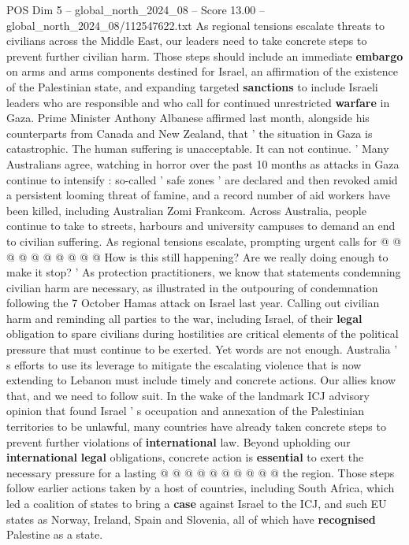 \begin{textsample}{POS Dim 5 – global\_north\_2024\_08 – Score 13.00 – global\_north\_2024\_08/112547622.txt}  \label{ex:f5_pos_374}
As regional tensions escalate threats to civilians across the Middle East, our leaders need to take concrete steps to prevent further civilian harm.
Those steps should include an immediate \textbf{embargo} on arms and arms components destined for Israel, an affirmation of the existence of the Palestinian state, and expanding targeted \textbf{sanctions} to include Israeli leaders who are responsible and who call for continued unrestricted \textbf{warfare} in Gaza.
Prime Minister Anthony Albanese affirmed last month, alongside his counterparts from Canada and New Zealand, that ' the situation in Gaza is catastrophic.
The human suffering is unacceptable.
It can not continue. ' Many Australians agree, watching in horror over the past 10 months as attacks in Gaza continue to intensify : so-called ' safe zones ' are declared and then revoked amid a persistent looming threat of famine, and a record number of aid workers have been killed, including Australian Zomi Frankcom.
Across Australia, people continue to take to streets, harbours and university campuses to demand an end to civilian suffering.
As regional tensions escalate, prompting urgent calls for @ @ @ @ @ @ @ @ @ @ How is this still happening?
Are we really doing enough to make it stop? ' As protection practitioners, we know that statements condemning civilian harm are necessary, as illustrated in the outpouring of condemnation following the 7 October Hamas attack on Israel last year.
Calling out civilian harm and reminding all parties to the war, including Israel, of their \textbf{legal} obligation to spare civilians during hostilities are critical elements of the political pressure that must continue to be exerted.
Yet words are not enough.
Australia ' s efforts to use its leverage to mitigate the escalating violence that is now extending to Lebanon must include timely and concrete actions.
Our allies know that, and we need to follow suit.
In the wake of the landmark ICJ advisory opinion that found Israel ' s occupation and annexation of the Palestinian territories to be unlawful, many countries have already taken concrete steps to prevent further violations of \textbf{international} law.
Beyond upholding our \textbf{international} \textbf{legal} obligations, concrete action is \textbf{essential} to exert the necessary pressure for a lasting @ @ @ @ @ @ @ @ @ @ the region.
Those steps follow earlier actions taken by a host of countries, including South Africa, which led a coalition of states to bring a \textbf{case} against Israel to the ICJ, and such EU states as Norway, Ireland, Spain and Slovenia, all of which have \textbf{recognised} Palestine as a state.

\end{textsample}
